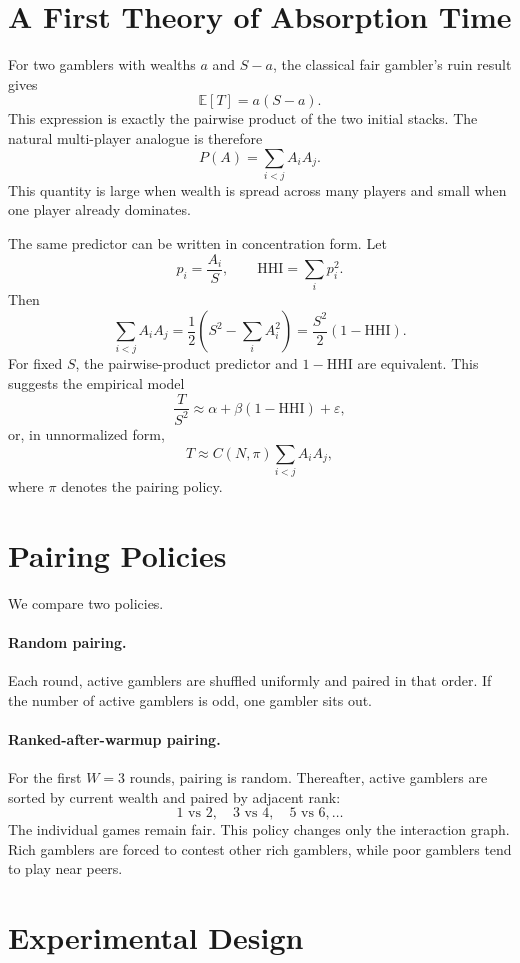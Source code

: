 \documentclass[10pt]{article}
\begin{document}
\section{A First Theory of Absorption Time}

For two gamblers with wealths $a$ and $S-a$, the classical fair gambler's ruin result gives
\[
  \mathbb{E}[T] = a(S-a).
\]
This expression is exactly the pairwise product of the two initial stacks. The natural multi-player analogue is therefore
\[
  P(A) = \sum_{i<j} A_i A_j.
\]
This quantity is large when wealth is spread across many players and small when one player already dominates.

The same predictor can be written in concentration form. Let
\[
  p_i = \frac{A_i}{S},
  \qquad
  \mathrm{HHI} = \sum_i p_i^2.
\]
Then
\[
  \sum_{i<j} A_i A_j
  =
  \frac{1}{2}\left(S^2-\sum_i A_i^2\right)
  =
  \frac{S^2}{2}\left(1-\mathrm{HHI}\right).
\]
For fixed $S$, the pairwise-product predictor and $1-\mathrm{HHI}$ are equivalent. This suggests the empirical model
\[
  \frac{T}{S^2}
  \approx
  \alpha + \beta(1-\mathrm{HHI}) + \varepsilon,
\]
or, in unnormalized form,
\[
  T \approx C(N,\pi)\sum_{i<j} A_iA_j,
\]
where $\pi$ denotes the pairing policy.

\section{Pairing Policies}

We compare two policies.

\paragraph{Random pairing.}
Each round, active gamblers are shuffled uniformly and paired in that order. If the number of active gamblers is odd, one gambler sits out.

\paragraph{Ranked-after-warmup pairing.}
For the first $W=3$ rounds, pairing is random. Thereafter, active gamblers are sorted by current wealth and paired by adjacent rank:
\[
  1\text{ vs }2,\quad 3\text{ vs }4,\quad 5\text{ vs }6,\ldots
\]
The individual games remain fair. This policy changes only the interaction graph. Rich gamblers are forced to contest other rich gamblers, while poor gamblers tend to play near peers.

\section{Experimental Design}
\end{document}
